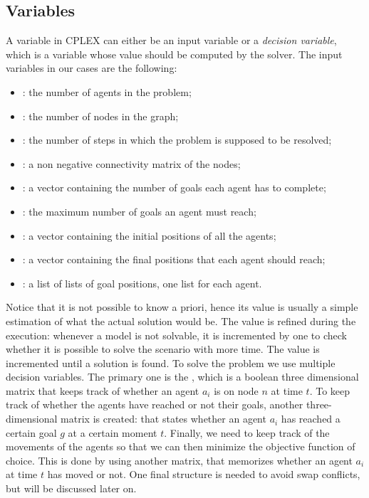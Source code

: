 \subsection{Variables}
A variable in CPLEX can either be an input variable or a \textit{decision
variable}, which is a variable whose value should be computed by the solver.
\newline
The input variables in our cases are the following: 
\begin{itemize}
  \item {}: the number of agents in the problem;
  \item {}: the number of nodes in the graph;
  \item {}: the number of steps in which the problem is supposed to
    be resolved;
  \item {}: a non negative connectivity matrix of
    the nodes;
  \item {}: a vector containing the number of goals each
    agent has to complete;
  \item {}: the maximum number of goals an agent must reach;
  \item {}: a vector containing the initial positions of
    all the agents;
  \item {}: a vector containing the final positions that
    each agent should reach;
  \item {}: a list of lists of goal
    positions, one list for each agent. 
\end{itemize}
Notice that it is not possible to know  a priori, hence its value
is usually a simple estimation of what the actual solution would be. The value
is refined during the execution: whenever a model is not solvable, it is
incremented by one to check whether it is possible to solve the scenario with
more time. The value is incremented until a solution is found. \newline
To solve the  problem we use multiple decision variables. The
primary one is the , which is a boolean
three dimensional matrix that keeps track of whether an agent $a_i$ is on node
$n$ at time $t$. \newline
To keep track of whether the agents have reached or not their goals, another
three-dimensional matrix is created:
 that states whether an agent
$a_i$ has reached a certain goal $g$ at a certain moment $t$. \newline
Finally, we need to keep track of the movements of the agents so that we can
then minimize the objective function of choice. This is done by using another
matrix,  that memorizes whether an agent
$a_i$ at time $t$ has moved or not. \newline
One final structure is needed to avoid swap conflicts, but will be discussed
later on.
%
%
